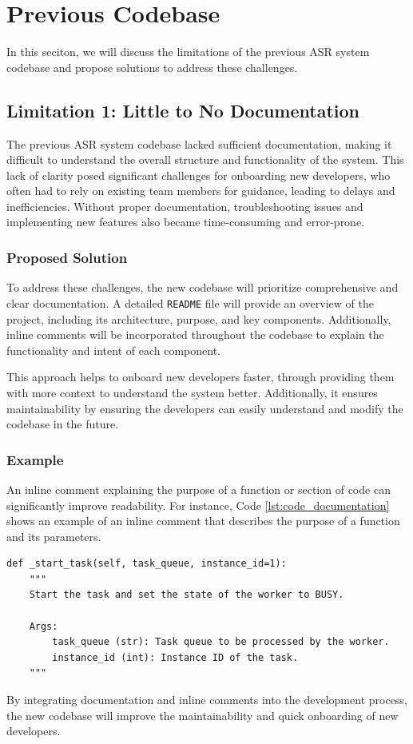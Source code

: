 \section{Previous Codebase}
In this seciton, we will discuss the limitations of the previous ASR system codebase and propose solutions to address these challenges.

\subsection{Limitation 1: Little to No Documentation}
The previous ASR system codebase lacked sufficient documentation, making it difficult to understand the overall structure and functionality of the system. This lack of clarity posed significant challenges for onboarding new developers, who often had to rely on existing team members for guidance, leading to delays and inefficiencies. Without proper documentation, troubleshooting issues and implementing new features also became time-consuming and error-prone.

\subsubsection{Proposed Solution}
To address these challenges, the new codebase will prioritize comprehensive and clear documentation. A detailed \texttt{README} file will provide an overview of the project, including its architecture, purpose, and key components. Additionally, inline comments will be incorporated throughout the codebase to explain the functionality and intent of each component.

This approach helps to onboard new developers faster, through providing them with more context to understand the system better. Additionally, it ensures maintainability by ensuring the developers can easily understand and modify the codebase in the future.

\subsubsection{Example}
An inline comment explaining the purpose of a function or section of code can significantly improve readability. For instance, Code \ref{lst:code_documentation} shows an example of an inline comment that describes the purpose of a function and its parameters.

\begin{lstlisting}[caption={Example Code Documentation}, label={lst:code_documentation}]
def _start_task(self, task_queue, instance_id=1):
    """
    Start the task and set the state of the worker to BUSY.

    Args:
        task_queue (str): Task queue to be processed by the worker.
        instance_id (int): Instance ID of the task.
    """
\end{lstlisting}

By integrating documentation and inline comments into the development process, the new codebase will improve the maintainability and quick onboarding of new developers.


